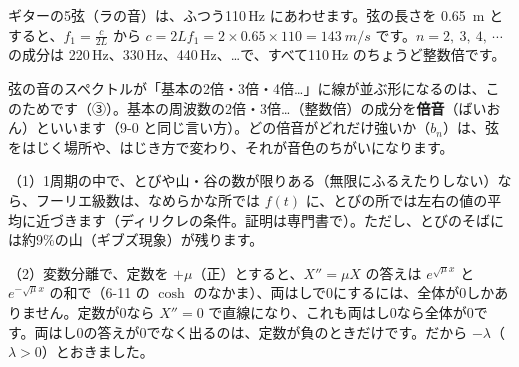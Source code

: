 ギターの5弦（ラの音）は、ふつう110\,Hz にあわせます。弦の長さを \qty{0.65}{m} とすると、$f_1=\frac{c}{2L}$ から $c=2Lf_1=2\times0.65\times110=\qty{143}{m/s}$ です。$n=2,\ 3,\ 4,\ \cdots$ の成分は 220\,Hz、330\,Hz、440\,Hz、…で、すべて110\,Hz のちょうど整数倍です。

弦の音のスペクトルが「基本の2倍・3倍・4倍…」に線が並ぶ形になるのは、このためです（③）。基本の周波数の2倍・3倍…（整数倍）の成分を\textbf{倍音}（ばいおん）といいます（9-0 と同じ言い方）。どの倍音がどれだけ強いか（$b_n$）は、弦をはじく場所や、はじき方で変わり、それが音色のちがいになります。

\begin{seikaku}
（1）1周期の中で、とびや山・谷の数が限りある（無限にふるえたりしない）なら、フーリエ級数は、なめらかな所では $f(t)$ に、とびの所では左右の値の平均に近づきます（ディリクレの条件。証明は専門書で）。ただし、とびのそばには約9\%の山（ギブズ現象）が残ります。\par
（2）変数分離で、定数を $+\mu$（正）とすると、$X''=\mu X$ の答えは $e^{\sqrt{\mu}x}$ と $e^{-\sqrt{\mu}x}$ の和で（6-11 の $\cosh$ のなかま）、両はしで0にするには、全体が0しかありません。定数が0なら $X''=0$ で直線になり、これも両はし0なら全体が0です。両はし0の答えが0でなく出るのは、定数が負のときだけです。だから $-\lambda$（$\lambda>0$）とおきました。
\end{seikaku}



\begin{kotoba}
\small
{}
\end{kotoba}

{}



